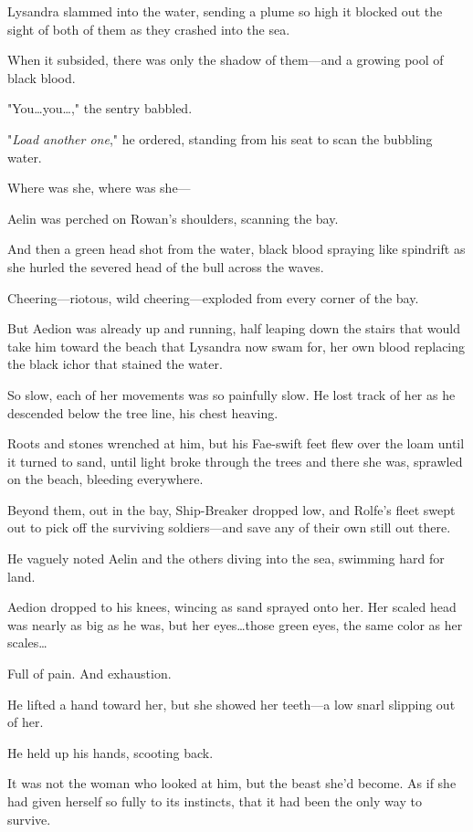 Lysandra slammed into the water, sending a plume so high it blocked out the sight of both of them as they crashed into the sea.

When it subsided, there was only the shadow of them---and a growing pool of black blood.

"You\ldots you\ldots ," the sentry babbled.

"\emph{Load another one}," he ordered, standing from his seat to scan the bubbling water.

Where was she, where was she---

Aelin was perched on Rowan's shoulders, scanning the bay.

And then a green head shot from the water, black blood spraying like spindrift as she hurled the severed head of the bull across the waves.

Cheering---riotous, wild cheering---exploded from every corner of the bay.

But Aedion was already up and running, half leaping down the stairs that would take him toward the beach that Lysandra now swam for, her own blood replacing the black ichor that stained the water.

So slow, each of her movements was so painfully slow.
He lost track of her as he descended below the tree line, his chest heaving.

Roots and stones wrenched at him, but his Fae-swift feet flew over the loam until it turned to sand, until light broke through the trees and there she was, sprawled on the beach, bleeding everywhere.

Beyond them, out in the bay, Ship-Breaker dropped low, and Rolfe's fleet swept out to pick off the surviving soldiers---and save any of their own still out there.

He vaguely noted Aelin and the others diving into the sea, swimming hard for land.

Aedion dropped to his knees, wincing as sand sprayed onto her.
Her scaled head was nearly as big as he was, but her eyes\ldots those green eyes, the same color as her scales\ldots{}

Full of pain.
And exhaustion.

He lifted a hand toward her, but she showed her teeth---a low snarl slipping out of her.

He held up his hands, scooting back.

It was not the woman who looked at him, but the beast she'd become.
As if she had given herself so fully to its instincts, that it had been the only way to survive.

